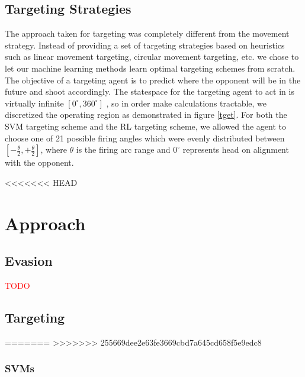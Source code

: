 \documentclass{article}
\newcommand{\xxx}[1]{\textcolor{red}{#1}}
\theoremstyle{plain}
\theoremstyle{definition}
\theoremstyle{remark}
\begin{document}
\subsection*{Targeting Strategies}
The approach taken for targeting was completely different from the movement strategy. Instead of providing a set of targeting strategies based on heuristics such as linear movement targeting, circular movement targeting, etc. we chose to let our machine learning methods learn optimal targeting schemes from scratch. The objective of a targeting agent is to predict where the opponent will be in the future and shoot accordingly. The statespace for the targeting agent to act in is virtually infinite $[0^{\circ}, 360^{\circ}]$ , so in order make calculations tractable, we discretized the operating region as demonstrated in figure \ref{tget}. For both the SVM targeting scheme and the RL targeting scheme, we allowed the agent to choose one of 21 possible firing angles which were evenly distributed between $[-\frac{\theta}{2}, +\frac{\theta}{2}]$, where $\theta$ is the firing arc range and $0^{\circ}$ represents head on alignment with the opponent.



<<<<<<< HEAD
\section{Approach}

\subsection*{Evasion}

\xxx{TODO}

\subsection*{Targeting}
=======
>>>>>>> 255669dee2e63fe3669cbd7a645cd658f5e9edc8


\subsubsection*{SVMs}
\end{document}
